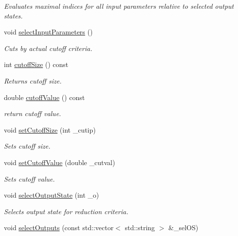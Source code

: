\begin{DoxyCompactItemize}
\begin{DoxyCompactList}\small\item\em Evaluates maximal indices for all input parameters relative to selected output states. \end{DoxyCompactList}\item 
void \hyperlink{class_go_s_u_m_1_1_c_reduction_a3b18d46962dec7a11f96ad1773a15c74}{select\-Input\-Parameters} ()
\begin{DoxyCompactList}\small\item\em Cuts by actual cutoff criteria. \end{DoxyCompactList}\item 
int \hyperlink{class_go_s_u_m_1_1_c_reduction_a68f48c7ff8bf72d334ea84d301f7dd27}{cutoff\-Size} () const 
\begin{DoxyCompactList}\small\item\em Returns cutoff size. \end{DoxyCompactList}\item 
double \hyperlink{class_go_s_u_m_1_1_c_reduction_a70da6e0602c08427806b963cae4ce4ff}{cutoff\-Value} () const 
\begin{DoxyCompactList}\small\item\em return cutoff value. \end{DoxyCompactList}\item 
void \hyperlink{class_go_s_u_m_1_1_c_reduction_a6ea081adb0a8d6b5ec9113cb0ef74c7f}{set\-Cutoff\-Size} (int \-\_\-cutip)
\begin{DoxyCompactList}\small\item\em Sets cutoff size. \end{DoxyCompactList}\item 
void \hyperlink{class_go_s_u_m_1_1_c_reduction_a60254f1638b7d41cb79f2982ad5a5787}{set\-Cutoff\-Value} (double \-\_\-cutval)
\begin{DoxyCompactList}\small\item\em Sets cutoff value. \end{DoxyCompactList}\item 
void \hyperlink{class_go_s_u_m_1_1_c_reduction_aa6b3d38e05164df345f58bc72ab3a2fa}{select\-Output\-State} (int \-\_\-o)
\begin{DoxyCompactList}\small\item\em Selects output state for reduction criteria. \end{DoxyCompactList}\item 
void \hyperlink{class_go_s_u_m_1_1_c_reduction_a63ac006f4aeca32dcad4e3dff8912aa3}{select\-Outputs} (const std\-::vector$<$ std\-::string $>$ \&\-\_\-sel\-O\-S)

\end{DoxyCompactItemize}
